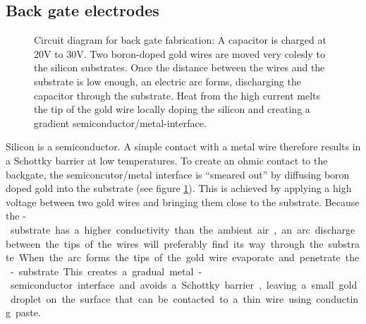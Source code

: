 \subsection{Back gate electrodes}

\begin{figure}
	\centering
	\caption{Circuit diagram for back gate fabrication: A capacitor is charged at 20V to 30V. Two boron-doped gold wires are moved very colesly to the silicon substrates. Once the distance between the wires and the substrate is low enough, an electric arc forms, discharging the capacitor through the substrate. Heat from the high current melts the tip of the gold wire locally doping the silicon and creating a gradient semiconductor/metal-interface.}\label{arc}
\end{figure}

Silicon is a semiconductor. A simple contact with a metal wire therefore results in a Schottky barrier at low temperatures. To create an ohmic contact to the backgate, the semiconcutor/metal interface is ``smeared out'' by diffusing boron doped gold into the substrate (see figure \ref{arc}). This is achieved by applying a high voltage between two gold wires and bringing them close to the substrate. Because the \si-substrate has a higher conductivity than the ambient air, an arc discharge between the tips of the wires will preferably find its way through the substrate. When the arc forms the tips of the gold wire evaporate and penetrate the \si-substrate. This creates a gradual metal-semiconductor interface and avoids a Schottky barrier, leaving a small gold droplet on the surface that can be contacted to a thin wire using conducting paste.

